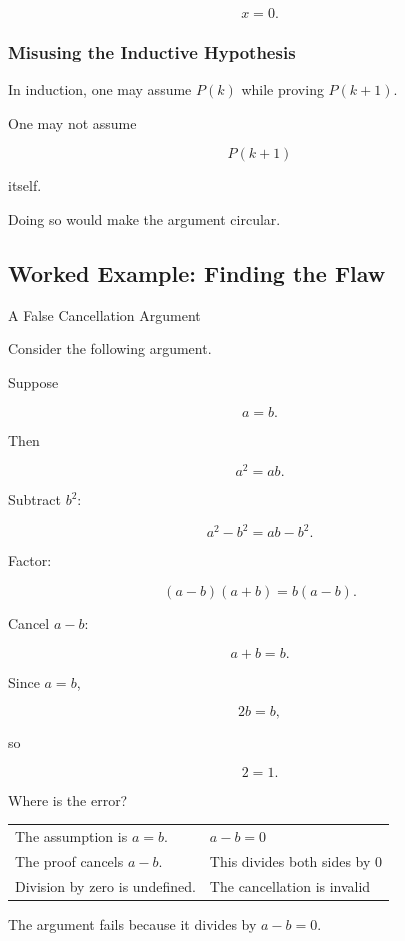 \[ x=0. \]

\subsubsection{Misusing the Inductive Hypothesis}
\label{subsec:proof-error-induction}

In induction, one may assume \(P(k)\) while proving \(P(k+1)\).

One may not assume

\[ P(k+1) \]

itself.

Doing so would make the argument circular.

\subsection{Worked Example: Finding the Flaw}
\label{subsec:worked-false-proof}

\begin{workedexamplebox}{A False Cancellation Argument}

Consider the following argument.

Suppose

\[ a=b. \]

Then

\[ a^2=ab. \]

Subtract \(b^2\):

\[ a^2-b^2=ab-b^2. \]

Factor:

\[ (a-b)(a+b)=b(a-b). \]

Cancel \(a-b\):

\[ a+b=b. \]

Since \(a=b\),

\[ 2b=b, \]

so

\[ 2=1. \]

Where is the error?

\begin{tabularx}{\textwidth}{@{}>{\raggedright\arraybackslash}p{}X@{}}
The assumption is \(a=b\). & \(a-b=0\)\\
The proof cancels \(a-b\). & This divides both sides by \(0\)\\
Division by zero is undefined. & The cancellation is invalid
\end{tabularx}

\begin{answerbox}
The argument fails because it divides by \(a-b=0\).
\end{answerbox}
\end{workedexamplebox}

